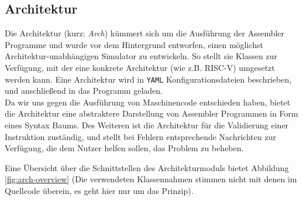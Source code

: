 \subsection{Architektur}


Die Architektur (kurz: \textit{Arch}) kümmert sich um die Ausführung der
Assembler Programme und wurde vor dem Hintergrund entworfen, einen möglichst
Architektur-unabhängigen Simulator zu entwickeln. So stellt sie Klassen zur
Verfügung, mit der eine konkrete Architektur (wie z.B. RISC-V) umgesetzt
werden kann. Eine Architektur wird in \texttt{YAML} Konfigurationsdateien
beschrieben, und anschließend in das Programm geladen. \\
Da wir uns gegen die Ausführung von Maschinencode entschieden haben, bietet
die Architektur eine abstraktere Darstellung von Assembler Programmen in Form
eines Syntax Baums. Des Weiteren ist die Architektur für die Validierung einer
Instruktion zuständig, und stellt bei Fehlern entsprechende Nachrichten zur
Verfügung, die dem Nutzer helfen sollen, das Problem zu beheben.

Eine Übersicht über die Schnittstellen des Architekturmoduls bietet Abbildung
\ref{fig:arch-overview} (Die verwendeten Klassennahmen stimmen nicht mit denen
im Quellcode überein, es geht hier nur um das Prinzip).

